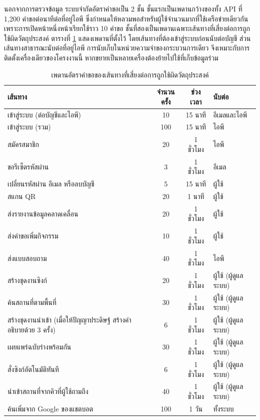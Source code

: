 นอกจากการตรวจข้อมูล ระบบจำกัดอัตราคำขอเป็น 2 ชั้น ชั้นแรกเป็นเพดานกว้างของทั้ง API ที่ 1,200 คำขอต่อนาทีต่อที่อยู่ไอพี ซึ่งกำหนดให้หลวมพอสำหรับผู้ใช้จำนวนมากที่ใช้เครือข่ายเดียวกัน เพราะการเปิดหน้าหนึ่งหน้าเรียกใช้ราว 10 คำขอ ชั้นที่สองเป็นเพดานเฉพาะเส้นทางที่เสี่ยงต่อการถูกใช้ผิดวัตถุประสงค์ ตารางที่ \ref{tab:rate_limits} แสดงเพดานที่ตั้งไว้ โดยเส้นทางที่ต้องเข้าสู่ระบบก่อนนับต่อบัญชี ส่วนเส้นทางสาธารณะนับต่อที่อยู่ไอพี การนับเก็บในหน่วยความจำของกระบวนการเดียว จึงเหมาะกับการติดตั้งเครื่องเดียวของโครงงานนี้ หากขยายเป็นหลายเครื่องต้องย้ายไปใช้ที่เก็บข้อมูลร่วม

\nopagebreak
\begin{table}[H]
\centering
\caption{เพดานอัตราคำขอของเส้นทางที่เสี่ยงต่อการถูกใช้ผิดวัตถุประสงค์}
\label{tab:rate_limits}
\begin{tabular}{|p{5.6cm}|c|c|p{2.6cm}|}
\hline
\textbf{เส้นทาง} & \textbf{จำนวนครั้ง} & \textbf{ช่วงเวลา} & \textbf{นับต่อ} \\
\hline
เข้าสู่ระบบ (ต่อบัญชีและไอพี) & 10 & 15 นาที & อีเมลและไอพี \\ \hline
เข้าสู่ระบบ (รวม) & 100 & 15 นาที & ไอพี \\ \hline
สมัครสมาชิก & 20 & 1 ชั่วโมง & ไอพี \\ \hline
ขอรีเซ็ตรหัสผ่าน & 3 & 1 ชั่วโมง & อีเมล \\ \hline
เปลี่ยนรหัสผ่าน อีเมล หรือลบบัญชี & 5 & 15 นาที & ผู้ใช้ \\ \hline
สแกน QR & 20 & 1 นาที & ผู้ใช้ \\ \hline
ส่งรายงานข้อมูลคลาดเคลื่อน & 20 & 1 ชั่วโมง & ผู้ใช้ \\ \hline
ส่งคำขอเพิ่มกิจกรรม & 10 & 1 ชั่วโมง & ผู้ใช้ \\ \hline
ส่งแบบสอบถาม & 40 & 1 ชั่วโมง & ไอพี \\ \hline
สร้างชุดงานซิงก์ & 20 & 1 ชั่วโมง & ผู้ใช้ (ผู้ดูแลระบบ) \\ \hline
ค้นสถานที่ตามพื้นที่ & 30 & 1 ชั่วโมง & ผู้ใช้ (ผู้ดูแลระบบ) \\ \hline
สร้างชุดงานนำเข้า (เมื่อให้ปัญญาประดิษฐ์ สร้างคำอธิบายด้วย 3 ครั้ง) & 6 & 1 ชั่วโมง & ผู้ใช้ (ผู้ดูแลระบบ) \\ \hline
เผยแพร่ฉบับร่างพร้อมกัน & 30 & 1 ชั่วโมง & ผู้ใช้ (ผู้ดูแลระบบ) \\ \hline
สั่งซิงก์อัตโนมัติทันที & 6 & 1 ชั่วโมง & ผู้ใช้ (ผู้ดูแลระบบ) \\ \hline
นำเข้าสถานที่จากคิวที่ผู้ใช้ถามถึง & 40 & 1 ชั่วโมง & ผู้ใช้ (ผู้ดูแลระบบ) \\ \hline
ค้นเพิ่มจาก Google ของแชตบอต & 100 & 1 วัน & ทั้งระบบ \\
\hline
\end{tabular}
\end{table}

